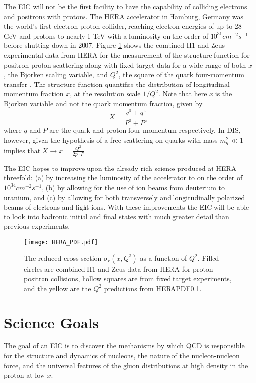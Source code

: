 The EIC will not be the first facility to have the capability of colliding electrons and positrons with protons. The HERA accelerator in Hamburg, Germany was the world's first electron-proton collider, reaching electron energies of up to 28 GeV and protons to nearly 1 TeV with a luminosity on the order of $10^{31}\unit{cm}^{-2}\unit{s}^{-1}$ before shutting down in 2007. Figure \ref{fig:HERA_pdf} shows the combined H1 and Zeus experimental data from HERA for the measurement of the structure function for positron-proton scattering along with fixed target data for a wide range of both $x$, the Bjorken scaling variable, and $Q^2$, the square of the quark four-momentum transfer \cite{HERAStructureFunction}. The structure function quantifies the distribution of longitudinal momentum fraction $x$, at the resolution scale $1/Q^2$. Note that here $x$ is the Bjorken variable and not the quark momentum fraction, given by
%
\begin{equation}
X = \frac{q^0 + q^z}{P^0 + P^z}
\label{eq:momFrac}
\end{equation}
%
where $q$ and $P$ are the quark and proton four-momentum respectively. In DIS, however, given the hypothesis of a free scattering on quarks with mass $m_q^2 \ll 1$ implies that $X \rightarrow x = \frac{Q^2}{2p\cdot P}$.

The EIC hopes to improve upon the already rich science produced at HERA threefold: (a) by increasing the luminosity of the accelerator to on the order of $10^{34}\unit{cm}^{-2}\unit{s}^{-1}$, (b) by allowing for the use of ion beams from deuterium to uranium, and (c) by allowing for both transversely and longitudinally polarized beams of electrons and light ions. With these improvements the EIC will be able to look into hadronic initial and final states with much greater detail than previous experiments.

\begin{figure}[!htb]
	\centering
	\texttt{[image: HERA\_PDF.pdf]}
	\caption{The reduced cross section $\sigma_{r}(x,Q^2)$ as a function of $Q^2$. Filled circles are combined H1 and Zeus data from HERA for proton-positron collisions, hollow squares are from fixed target experiments, and the yellow are the $Q^2$ predictions from HERAPDF0.1.}
	\label{fig:HERA_pdf}
\end{figure}

\section{Science Goals}
The goal of an EIC is to discover the mechanisms by which QCD is responsible for the structure and dynamics of nucleons, the nature of the nucleon-nucleon force, and the universal features of the gluon distributions at high density in the proton at low $x$.

